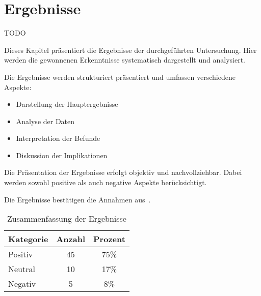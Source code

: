 
\chapter{Ergebnisse}\label{cha:results}

TODO

Dieses Kapitel präsentiert die Ergebnisse der durchgeführten Untersuchung. Hier werden die gewonnenen Erkenntnisse systematisch dargestellt und analysiert.

Die Ergebnisse werden strukturiert präsentiert und umfassen verschiedene Aspekte:

\begin{itemize}[leftmargin=0.63cm, label=\textbullet]
    \item Darstellung der Hauptergebnisse
    \item Analyse der Daten
    \item Interpretation der Befunde
    \item Diskussion der Implikationen
\end{itemize}

Die Präsentation der Ergebnisse erfolgt objektiv und nachvollziehbar. Dabei werden sowohl positive als auch negative Aspekte berücksichtigt.

Die Ergebnisse bestätigen die Annahmen aus~\cite{beispiel2024}.

\begin{table}[htbp]
    \centering
    \caption{Zusammenfassung der Ergebnisse}
    \label{tab:ergebnisse}
        \begin{tabular}{lcc}
        \toprule
        Kategorie & Anzahl & Prozent \\
        \midrule
        Positiv & 45 & 75\% \\
        Neutral & 10 & 17\% \\
        Negativ & 5 & 8\% \\
        \bottomrule
        \end{tabular}
\end{table}

